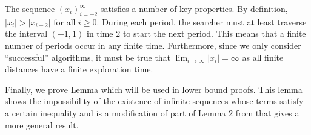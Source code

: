 The sequence $\left(x_i\right)_{i=-2}^{\infty}$ satisfies a number of key properties. By definition, $|x_{i}| > |x_{i-2}|$ for all $i\geq0$. During each period, the searcher must at least traverse the interval $(-1,1)$ in time $2$ to start the next period. This means that a finite number of periods occur in any finite time. Furthermore, since we only consider ``successful'' algorithms, it must be true that $\lim_{i\to \infty}|x_i| = \infty$ as all finite distances have a finite exploration time.

Finally, we prove Lemma  which will be used in lower bound proofs.
This lemma shows the impossibility of the existence of infinite sequences whose terms satisfy a certain inequality and is a modification of part of Lemma 2 from \cite{beck1970linearsearch} that gives a more general result.

